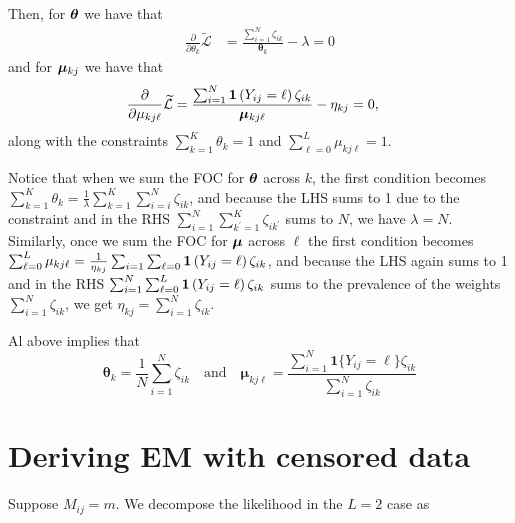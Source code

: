 \documentclass[11pt]{article}
\begin{document}
Then, for \(\bm{\theta}\) we have that
\begin{align*}
\frac{\partial}{\partial {\theta}_{k}}\widetilde{\mathcal{L}}
&= \frac{\sum^{N}_{i=1}\zeta_{ik}}{\bm{\theta}_{k}} - \lambda  = 0
\end{align*}
and for \(\bm{\mu}_{kj}\) we have that
\begin{align*}
\frac{\partial}{\partial {\mu}_{kj\ell}}\widetilde{\mathcal{L}}
&= \frac{\sum^{N}_{i=1}\bm{1}\left(Y_{ij} = \ell\right)\zeta_{ik}}{\bm{\mu}_{kj\ell}} - \eta_{kj}  = 0,
\end{align*}
along with the constraints \(\sum^K_{k=1}\theta_k = 1\) and \(\sum^L_{\ell = 0} \mu_{kj\ell} = 1\).

Notice that when we sum the FOC for \(\bm{\theta}\) across \(k\), the first condition becomes \(\sum^K_{k=1}\theta_k = \frac{1}{\lambda}\sum^K_{k = 1}\sum^N_{i=i}\zeta_{ik}\), and because the LHS sums to 1 due to the constraint and in the RHS  \(\sum^{N}_{i=1}\sum^{K}_{k^\prime =1}\zeta_{ik^\prime}\) sums to \(N\), we have \(\lambda = N\). Similarly, once we sum the FOC for \(\bm{\mu}\) across \(\ell\) the first condition becomes  \(\sum^L_{\ell=0} \mu_{kj\ell} = \frac{1}{\eta_{kj}}\sum_{i=1}\sum_{\ell=0}\bm{1}\left(Y_{ij} = \ell\right)\zeta_{ik}\), and because the LHS again sums to 1 and in the RHS   \(\sum^{N}_{i=1}\sum^{L}_{\ell = 0}\bm{1}\left(Y_{ij} = \ell\right)\zeta_{ik}\) sums to the prevalence of the weights \(\sum^{N}_{i=1}\zeta_{ik}\), we get \(\eta_{kj}= \sum^{N}_{i=1}\zeta_{ik}\).

Al above implies that
\begin{equation}
\bm{\theta}_{k} = \frac{1}{N}\sum^{N}_{i=1}\zeta_{ik}\quad
\text{and}\quad
\bm{\mu}_{kj\ell} =
\frac{\sum^{N}_{i=1}\bm{1}\{Y_{ij} = \ell\}\zeta_{ik}}{\sum^{N}_{i=1}\zeta_{ik}}
\end{equation}


\section{Deriving EM with censored data}

Suppose \(M_{ij} = m\). We decompose the likelihood in the \(L = 2\) case as 

\end{document}
